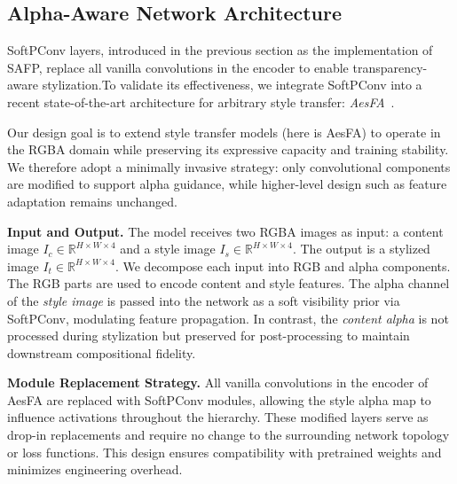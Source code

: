 \documentclass[letterpaper]{article} %
\begin{document}


\subsection{Alpha-Aware Network Architecture}

SoftPConv layers, introduced in the previous section as the implementation of SAFP, replace all vanilla convolutions in the encoder to enable transparency-aware stylization.To validate its effectiveness, we integrate SoftPConv into a recent state-of-the-art architecture for arbitrary style transfer: \textit{AesFA}~\cite{kwon2024aesfa}.

Our design goal is to extend style transfer models (here is AesFA) to operate in the RGBA domain while preserving its expressive capacity and training stability. We therefore adopt a minimally invasive strategy: only convolutional components are modified to support alpha guidance, while higher-level design such as feature adaptation remains unchanged.

\noindent\textbf{Input and Output.}
The model receives two RGBA images as input: a content image 
$I_c \in \mathbb{R}^{H \times W \times 4}$ and a style image $I_s \in \mathbb{R}^{H \times W \times 4}$. The output is a stylized image $I_t \in \mathbb{R}^{H \times W \times 4}$. We decompose each input into RGB and alpha components. The RGB parts are used to encode content and style features. The alpha channel of the \textit{style image} is passed into the network as a soft visibility prior via SoftPConv, modulating feature propagation. In contrast, the \textit{content alpha} is not processed during stylization but preserved for post-processing to maintain downstream compositional fidelity.

\noindent\textbf{Module Replacement Strategy.}
All vanilla convolutions in the encoder of AesFA are replaced with SoftPConv modules, allowing the style alpha map to influence activations throughout the hierarchy. These modified layers serve as drop-in replacements and require no change to the surrounding network topology or loss functions. This design ensures compatibility with pretrained weights and minimizes engineering overhead.
\end{document}
